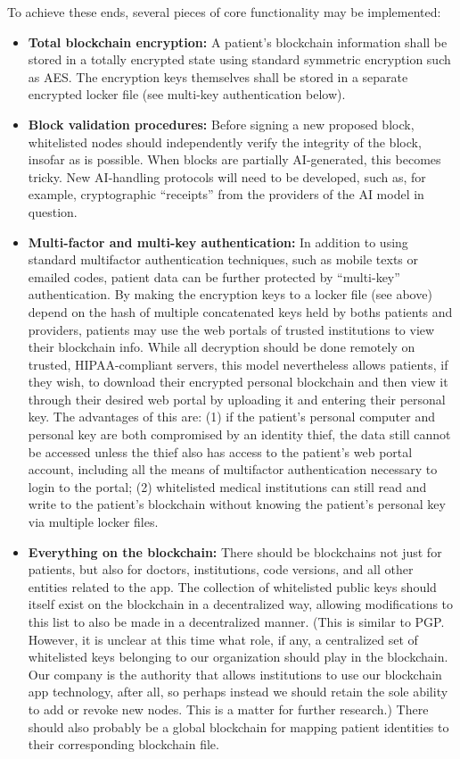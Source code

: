\documentclass[12pt]{article}
\begin{document}
To achieve these ends, several pieces of core functionality may be implemented:
\begin{itemize}
\item {\bf Total blockchain encryption:} A patient's blockchain information shall be stored in a totally encrypted state using standard symmetric encryption such as AES. The encryption keys themselves shall be stored in a separate encrypted locker file (see multi-key authentication below).

\item {\bf Block validation procedures:} Before signing a new proposed block, whitelisted nodes should independently verify the integrity of the block, insofar as is possible. When blocks are partially AI-generated, this becomes tricky. New AI-handling protocols will need to be developed, such as, for example, cryptographic ``receipts'' from the providers of the AI model in question.

\item {\bf Multi-factor and multi-key authentication:} In addition to using standard multifactor authentication techniques, such as mobile texts or emailed codes, patient data can be further protected by ``multi-key'' authentication. By making the encryption keys to a locker file (see above) depend on the hash of multiple concatenated keys held by boths patients and providers, patients may use the web portals of trusted institutions to view their blockchain info. While all decryption should be done remotely on trusted, HIPAA-compliant servers,  this model nevertheless allows patients, if they wish, to download their encrypted personal blockchain and then view it through their desired web portal by uploading it and entering their personal key. The advantages of this are: (1) if the patient's personal computer and personal key are both compromised by an identity thief, the data still cannot be accessed unless the thief also has access to the patient's web portal account, including all the means of multifactor authentication necessary to login to the portal; (2) whitelisted medical institutions can still read and write to the patient's blockchain without knowing the patient's personal key via multiple locker files.

\item {\bf Everything on the blockchain:} There should be blockchains not just for patients, but also for doctors, institutions, code versions, and all other entities related to the app. The collection of whitelisted public keys should itself exist on the blockchain in a decentralized way, allowing modifications to this list to also be made in a decentralized manner. (This is similar to PGP. However, it is unclear at this time what role, if any, a centralized set of whitelisted keys belonging to our organization should play in the blockchain. Our company is the authority that allows institutions to use our blockchain app technology, after all, so perhaps instead we should retain the sole ability to add or revoke new nodes. This is a matter for further research.) There should also probably be a global blockchain for mapping patient identities to their corresponding blockchain file.

\end{itemize}
\end{document}
